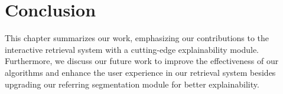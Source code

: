 \chapter{Conclusion}
\label{chap-conclusion}
\begin{ChapAbstract}
This chapter summarizes our work, emphasizing our contributions to the interactive retrieval system with a cutting-edge explainability module. Furthermore, we discuss our future work to improve the effectiveness of our algorithms and enhance the user experience in our retrieval system besides upgrading our referring segmentation module for better explainability. 
\end{ChapAbstract}



